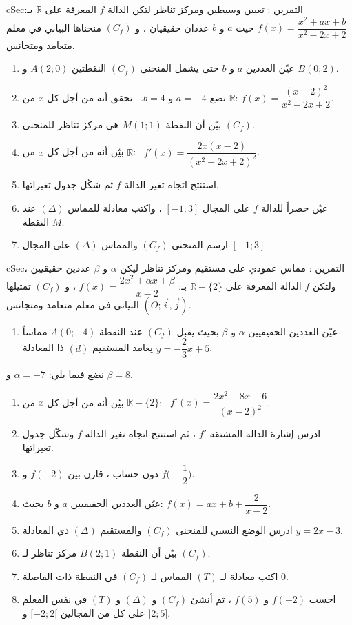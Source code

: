 \documentclass[12pt,a4paper]{article}
\newenvironment{BOX}[2]{\begin{otherlanguage}{english}\begin{arbox}{#1}{#2}}{\end{arbox}\end{otherlanguage}}
\newcounter{exo}
\newenvironment{tamrin}[1]{\stepcounter{exo}\begin{BOX}{cSec}{التمرين \theexo: #1}}{\end{BOX}}
\newcommand{\R}{\mathbb{R}}
\begin{document}
\begin{tamrin}{تعيين وسيطين ومركز تناظر}
لتكن الدالة $f$ المعرفة على $\R$ بـ: $f(x)=\dfrac{x^2+ax+b}{x^2-2x+2}$ حيث $a$ و $b$ عددان حقيقيان ، و $(C_f)$ منحناها البياني في معلم متعامد ومتجانس.
\begin{enumerate}
\item عيّن العددين $a$ و $b$ حتى يشمل المنحنى $(C_f)$ النقطتين $A(2;0)$ و $B(0;2)$.
\item نضع $a=-4$ و $b=4$. \ تحقق أنه من أجل كل $x$ من $\R$: $f(x)=\dfrac{(x-2)^2}{x^2-2x+2}$.
\item بيّن أن النقطة $M(1;1)$ هي مركز تناظر للمنحنى $(C_f)$.
\item بيّن أنه من أجل كل $x$ من $\R$: \ $f'(x)=\dfrac{2x(x-2)}{(x^2-2x+2)^2}$.
\item استنتج اتجاه تغير الدالة $f$ ثم شكّل جدول تغيراتها.
\item عيّن حصراً للدالة $f$ على المجال $[-1;3]$ ، واكتب معادلة للمماس $(\Delta)$ عند النقطة $M$.
\item ارسم المنحنى $(C_f)$ والمماس $(\Delta)$ على المجال $[-1;3]$.
\end{enumerate}
\end{tamrin}

\begin{tamrin}{مماس عمودي على مستقيم ومركز تناظر}
ليكن $\alpha$ و $\beta$ عددين حقيقيين ، ولتكن $f$ الدالة المعرفة على $\R-\{2\}$ بـ: $f(x)=\dfrac{2x^2+\alpha x+\beta}{x-2}$ ، و $(C_f)$ تمثيلها البياني في معلم متعامد ومتجانس $(O;\vec i,\vec j)$.
\begin{enumerate}
\item عيّن العددين الحقيقيين $\alpha$ و $\beta$ بحيث يقبل $(C_f)$ عند النقطة $A(0;-4)$ مماساً يعامد المستقيم $(d)$ ذا المعادلة $y=-\dfrac23x+5$.
\end{enumerate}
نضع فيما يلي: $\alpha=-7$ و $\beta=8$.
\begin{enumerate}[resume]
\item بيّن أنه من أجل كل $x$ من $\R-\{2\}$: \ $f'(x)=\dfrac{2x^2-8x+6}{(x-2)^2}$.
\item ادرس إشارة الدالة المشتقة $f'$ ، ثم استنتج اتجاه تغير الدالة $f$ وشكّل جدول تغيراتها.
\item دون حساب ، قارن بين $f(-2)$ و $f\Big(-\dfrac12\Big)$.
\item عيّن العددين الحقيقيين $a$ و $b$ بحيث: $f(x)=ax+b+\dfrac{2}{x-2}$.
\item ادرس الوضع النسبي للمنحنى $(C_f)$ والمستقيم $(\Delta)$ ذي المعادلة $y=2x-3$.
\item بيّن أن النقطة $B(2;1)$ مركز تناظر لـ $(C_f)$.
\item اكتب معادلة لـ $(T)$ المماس لـ $(C_f)$ في النقطة ذات الفاصلة $0$.
\item احسب $f(-2)$ و $f(5)$ ، ثم أنشئ $(C_f)$ و $(\Delta)$ و $(T)$ في نفس المعلم على كل من المجالين $[-2;2[$ و $]2;5]$.
\end{enumerate}
\end{tamrin}
\end{document}
